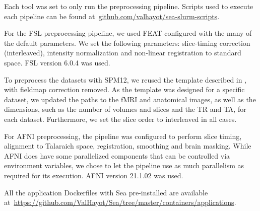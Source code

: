     Each tool was set to only run the preprocessing pipeline. Scripts used to
    execute each pipeline can be found
    at~\url{github.com/valhayot/sea-slurm-scripts}.
    
    For the FSL preprocessing pipeline, we used FEAT configured with the many of
    the default parameters. We set the following parameters: slice-timing
    correction (interleaved), intensity normalization and non-linear
    registration to standard space. FSL version 6.0.4 was used.
    
    To preprocess the datasets with SPM12, we reused the template described in
    \cite{haitas2021age}, with fieldmap correction removed. As the template was
    designed for a specific dataset, we updated the paths to the fMRI and
    anatomical images, as well as the dimensions, such as the number of volumes
    and slices and the TR and TA, for each dataset. Furthermore, we set the
    slice order to interleaved in all cases. 
    
    For AFNI preprocessing, the pipeline was configured to perform slice timing,
    alignment to Talaraich space, registration, smoothing and brain masking.
    While AFNI does have some parallelized components that can be controlled via
    environment variables, we chose to let the pipeline use as much parallelism
    as required for its execution. AFNI version 21.1.02 was used.

    All the application Dockerfiles with Sea pre-installed are available
    at~\url{https://github.com/ValHayot/Sea/tree/master/containers/applications}.
    

    
